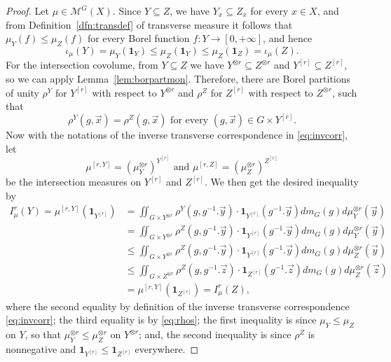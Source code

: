\documentclass{amsart}
\numberwithin{equation}{subsection}
\theoremstyle{remark}
\begin{document}
\begin{proof}
Let \(\mu\in\mathcal{M}^{G}\left(X\right)\). Since \(Y\subseteq Z\), we have \(Y_{x}\subseteq Z_{x}\) for every \(x\in X\), and from Definition~\ref{dfn:transdef} of transverse measure it follows that \(\mu_{Y}\left(f\right)\leq\mu_{Z}\left(f\right)\) for every Borel function \(f:Y\to\left[0,+\infty\right]\), and hence
\[\iota_{\mu}\left(Y\right)=\mu_{Y}\left(\mathbf{1}_{Y}\right)\leq\mu_{Z}\left(\mathbf{1}_{Y}\right)\leq\mu_{Z}\left(\mathbf{1}_{Z}\right)=\iota_{\mu}\left(Z\right).\]
For the intersection covolume, from \(Y\subseteq Z\) we have \(Y^{\otimes r}\subseteq Z^{\otimes r}\) and \(Y^{\left[r\right]}\subseteq Z^{\left[r\right]}\), so we can apply Lemma~\ref{lem:borpartmon}. Therefore, there are Borel partitions of unity \(\rho^{Y}\) for \(Y^{\left[r\right]}\) with respect to \(Y^{\otimes r}\) and \(\rho^{Z}\) for \(Z^{\left[r\right]}\) with respect to \(Z^{\otimes r}\), such that
\begin{equation}\label{eq:rhos}
\rho^{Y}\left(g,\vec{x}\right)=\rho^{Z}\left(g,\vec{x}\right)\text{ for every }\left(g,\vec{x}\right)\in G\times Y^{\left[r\right]}.
\end{equation}
Now with the notations of the inverse transverse correspondence in \eqref{eq:invcorr}, let
\[\mu^{\left[r,Y\right]}=\left(\mu_{Y}^{\otimes r}\right)^{Y^{\left[r\right]}}\text{ and }\mu^{\left[r,Z\right]}=\left(\mu_{Z}^{\otimes r}\right)^{Z^{\left[r\right]}}\]
be the intersection measures on \(Y^{\left[r\right]}\) and \(Z^{\left[r\right]}\). We then get the desired inequality by
\begin{align*}
I_{\mu}^{r}\left(Y\right)	=\mu^{\left[r,Y\right]}\left(\mathbf{1}_{Y^{\left[r\right]}}\right)
&=\iint\nolimits_{G\times Y^{\otimes r}}\rho^{Y}\left(g,g^{-1}.\vec{y}\right)\cdot\mathbf{1}_{Y^{\left[r\right]}}\left(g^{-1}.\vec{y}\right)dm_{G}\left(g\right)d\mu_{Y}^{\otimes r}\left(\vec{y}\right)\\
&=\iint\nolimits_{G\times Y^{\otimes r}}\rho^{Z}\left(g,g^{-1}.\vec{y}\right)\cdot\mathbf{1}_{Y^{\left[r\right]}}\left(g^{-1}.\vec{y}\right)dm_{G}\left(g\right)d\mu_{Y}^{\otimes r}\left(\vec{y}\right)\\
&\leq\iint\nolimits_{G\times Y^{\otimes r}}\rho^{Z}\left(g,g^{-1}.\vec{y}\right)\cdot\mathbf{1}_{Y^{\left[r\right]}}\left(g^{-1}.\vec{y}\right)dm_{G}\left(g\right)d\mu_{Z}^{\otimes r}\left(\vec{y}\right)\\
&\leq\iint\nolimits_{G\times Z^{\otimes r}}\rho^{Z}\left(g,g^{-1}.\vec{z}\right)\cdot\mathbf{1}_{Z^{\left[r\right]}}\left(g^{-1}.\vec{z}\right)dm_{G}\left(g\right)d\mu_{Z}^{\otimes r}\left(\vec{z}\right)\\
&=\mu^{\left[r,Y\right]}\left(\mathbf{1}_{Z^{\left[r\right]}}\right)=I_{\mu}^{r}\left(Z\right),
\end{align*}
where the second equality by definition of the inverse transverse correspondence \eqref{eq:invcorr}; the third equality is by \eqref{eq:rhos}; the first inequality is since \(\mu_{Y}\leq\mu_{Z}\) on \(Y\), so that \(\mu_{Y}^{\otimes r}\leq\mu_{Z}^{\otimes r}\) on \(Y^{\otimes r}\); and, the second inequality is since \(\rho^{Z}\) is nonnegative and \(\mathbf{1}_{Y^{\left[r\right]}}\leq\mathbf{1}_{Z^{\left[r\right]}}\) everywhere.
\end{proof}
\end{document}
